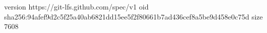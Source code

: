 version https://git-lfs.github.com/spec/v1
oid sha256:94afef9d2c5f25a40ab6821dd15ee5f2f80661b7ad436cef8a5be9d458e0c75d
size 7608
